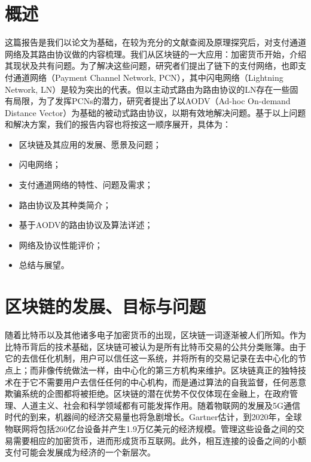 \documentclass[12pt,a4paper]{article}
\begin{document}
\justifying
\setlength{\parindent}{2em}



\tableofcontents
\clearpage

\section{概述}
这篇报告是我们以论文\cite{hoenisch2018aodv}为基础，在较为充分的文献查阅及原理探究后，对支付通道网络及其路由协议做的内容梳理。我们从区块链的一大应用：加密货币开始，介绍其现状及共有问题。为了解决这些问题，研究者们提出了链下的支付网络，也即支付通道网络（Payment Channel Network, PCN），其中闪电网络（Lightning Network, LN）是较为突出的代表。但以主动式路由为路由协议的LN存在一些固有局限，为了发挥PCNs的潜力，研究者提出了以AODV（Ad-hoc On-demand Distance Vector）为基础的被动式路由协议，以期有效地解决问题。基于以上问题和解决方案，我们的报告内容也将按这一顺序展开，具体为：
\begin{itemize}
	\item 区块链及其应用的发展、愿景及问题；
	\item 闪电网络；
	\item 支付通道网络的特性、问题及需求；
	\item 路由协议及其种类简介；
	\item 基于AODV的路由协议及算法详述；
	\item 网络及协议性能评价；
	\item 总结与展望。
\end{itemize}

\section{区块链的发展、目标与问题}
随着比特币\cite{nakamoto2008bitcoin}以及其他诸多电子加密货币的出现，区块链一词逐渐被人们所知。作为比特币背后的技术基础，区块链可被认为是所有比特币交易的公共分类账簿\cite{swan2015blockchain}。由于它的去信任化机制，用户可以信任这一系统，并将所有的交易记录在去中心化的节点上；而非像传统做法一样，由中心化的第三方机构来维护。区块链真正的独特技术在于它不需要用户去信任任何的中心机构，而是通过算法的自我监督，任何恶意欺骗系统的企图都将被拒绝。区块链的潜在优势不仅仅体现在金融上，在政府管理、人道主义、社会和科学领域都有可能发挥作用。随着物联网的发展及5G通信时代的到来，机器间的经济交易量也将急剧增长。Gartner\cite{iot_economic}估计，到2020年，全球物联网将包括260亿台设备并产生1.9万亿美元的经济规模。管理这些设备之间的交易需要相应的加密货币，进而形成货币互联网。此外，相互连接的设备之间的小额支付可能会发展成为经济的一个新层次\cite{new_layer_economy}。
\end{document}
